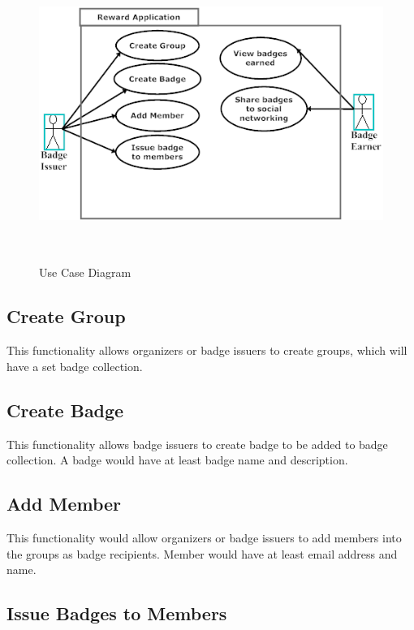 \vspace{3em}
\begin{figure}[H]
\begin{center}
\includegraphics[height=3.8in,width=5.5in]{images/UseCase.png}
\caption{Use Case Diagram}
\label{fig:use_case}
\end{center}
\end{figure}

\subsection{Create Group}

This functionality allows organizers or badge issuers to create groups, which will have a set badge collection.

\subsection{Create Badge} 

This functionality allows badge issuers to create badge to be added to badge collection. A badge would have at least badge name and description.

\subsection{Add Member}

This functionality would allow organizers or badge issuers to add members into the groups as badge recipients. Member would have at least email address and name.

\subsection{Issue Badges to Members}

